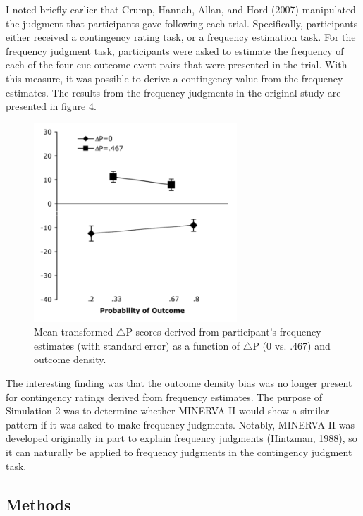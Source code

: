 \documentclass[
  english,
  man,floatsintext]{apa6}
\begin{document}
I noted briefly earlier that Crump, Hannah, Allan, and Hord (2007) manipulated the judgment that participants gave following each trial. Specifically, participants either received a contingency rating task, or a frequency estimation task. For the frequency judgment task, participants were asked to estimate the frequency of each of the four cue-outcome event pairs that were presented in the trial. With this measure, it was possible to derive a contingency value from the frequency estimates. The results from the frequency judgments in the original study are presented in figure 4.

\begin{figure}

{\centering \includegraphics[width=3in]{imgs/crump_frequency_results} 

}

\caption{Mean transformed $\triangle$P scores derived from participant’s frequency estimates (with standard error) as a function of $\triangle$P (0 vs. .467) and outcome density.}\label{fig:unnamed-chunk-6}
\end{figure}

The interesting finding was that the outcome density bias was no longer present for contingency ratings derived from frequency estimates. The purpose of Simulation 2 was to determine whether MINERVA II would show a similar pattern if it was asked to make frequency judgments. Notably, MINERVA II was developed originally in part to explain frequency judgments (Hintzman, 1988), so it can naturally be applied to frequency judgments in the contingency judgment task.

\hypertarget{methods-1}{%
\subsection{Methods}\label{methods-1}}
\end{document}

